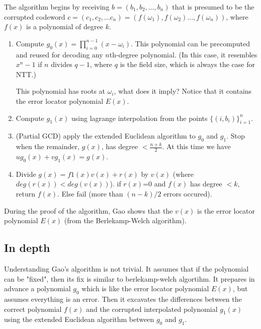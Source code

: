 The algorithm begins by receiving $b=(b_1,b_2,\dots,b_n)$ that is presumed to
be the corrupted codeword $c=(c_1,c_2,\dots c_n)=(f(\omega_1),f(\omega_2)\dots, f(\omega_n))$,
where $f(x)$ is a polynomial of degree $k$.

\begin{enumerate}
    \item Compute $g_0(x)=\prod_{i=0}^{n-1}(x-\omega_i)$. 
    This polynomial can be precomputed and reused for decoding any 
    $n$th-degree polynomial. 
    (In this case, it resembles $x^n-1$ if $n$ divides $q-1$,
    where $q$ is the field size, which is always the case for NTT.) 

    This polynomial has roots at $\omega_i$, what does it imply?
    Notice that it contains the error locator polynomial $E(x)$.

    \item Compute $g_1(x)$ using lagrange interpolation from the points $\{(i,b_i)\}_{i=1}^{n}$.

    \item (Partial GCD) apply the extended Euclidean algorithm to 
    $g_0$ and $g_1$. Stop when the remainder, $g(x)$, has degree $<\frac{n+k}{2}$.
    At this time we have $ug_0(x)+vg_1(x)=g(x)$.

    \item Divide $g(x)=f1(x)v(x)+r(x)$ by $v(x)$ (where $deg(r(x))<deg(v(x))$).
    if $r(x)$=0 and $f(x)$ has degree $<k$, return $f(x)$. Else fail 
    (more than $(n-k)/2$ errors occured).
\end{enumerate}



During the proof of the algorithm, Gao shows that the $v(x)$ is the error 
locator polynomial $E(x)$ (from the Berlekamp-Welch algorithm).

\subsection{In depth}


Understanding Gao's algorithm is not trivial.
It assumes that if the polynomial can be "fixed", then its fix is 
similar to berlekamp-welch algortihm. It prepares in advance 
a polynomial $g_0$ which is like the error locator polynomial $E(x)$,
but assumes everything is an error. 
Then it excavates the differences between the correct polynomial $f(x)$ and the
corrupted interpolated polynomial $g_1(x)$ using the extended Euclidean algorithm
between $g_0$ and $g_1$.

